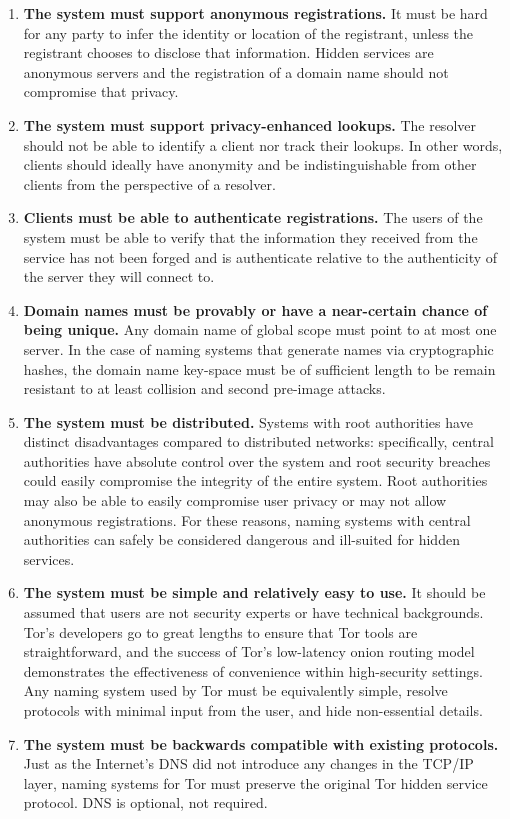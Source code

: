 \begin{enumerate}
	\item \textbf{The system must support anonymous registrations.} It must be hard for any party to infer the identity or location of the registrant, unless the registrant chooses to disclose that information. Hidden services are anonymous servers and the registration of a domain name should not compromise that privacy.
	\item \textbf{The system must support privacy-enhanced lookups.} The resolver should not be able to identify a client nor track their lookups. In other words, clients should ideally have anonymity and be indistinguishable from other clients from the perspective of a resolver.
	\item \textbf{Clients must be able to authenticate registrations.} The users of the system must be able to verify that the information they received from the service has not been forged and is authenticate relative to the authenticity of the server they will connect to. %
	\item \textbf{Domain names must be provably or have a near-certain chance of being unique.} Any domain name of global scope must point to at most one server. In the case of naming systems that generate names via cryptographic hashes, the domain name key-space must be of sufficient length to be remain resistant to at least collision and second pre-image attacks.
	\item \textbf{The system must be distributed.} Systems with root authorities have distinct disadvantages compared to distributed networks: specifically, central authorities have absolute control over the system and root security breaches could easily compromise the integrity of the entire system. Root authorities may also be able to easily compromise user privacy or may not allow anonymous registrations. For these reasons, naming systems with central authorities can safely be considered dangerous and ill-suited for hidden services.
	\item \textbf{The system must be simple and relatively easy to use.} It should be assumed that users are not security experts or have technical backgrounds. Tor's developers go to great lengths to ensure that Tor tools are straightforward, and the success of Tor's low-latency onion routing model demonstrates the effectiveness of convenience within high-security settings. Any naming system used by Tor must be equivalently simple, resolve protocols with minimal input from the user, and hide non-essential details.
	\item \textbf{The system must be backwards compatible with existing protocols.} Just as the Internet's DNS did not introduce any changes in the TCP/IP layer, naming systems for Tor must preserve the original Tor hidden service protocol. DNS is optional, not required.
\end{enumerate}

